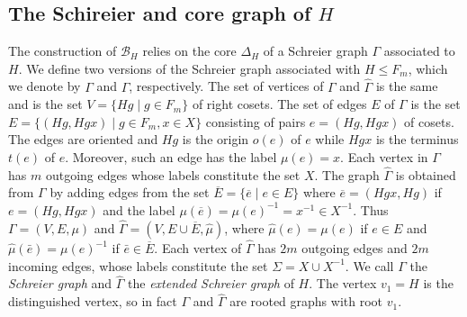 \documentclass{article}
\newcommand{\B}{\mathcal{B}}
\begin{document}
\subsection{The Schireier and core graph of $H$}\label{sec:Schreier_core}
The construction of $\B_H$ relies on the core $\Delta_H$ of a Schreier graph $\Gamma$ associated to $H$. We define two versions of the Schreier graph associated with $H \leq F_m$, which we denote by $\Gamma$ and $\widehat{\Gamma}$, respectively. The set of vertices of $\Gamma$ and $\widehat{\Gamma}$ is the same and is the set $V = \{ Hg \mid g \in F_m\}$ of right cosets. The set of edges $E$ of $\Gamma$ is the set $E = \{(Hg, Hgx)\mid  g \in F_m, x \in X\}$ consisting of pairs $e = (Hg, Hgx)$ of cosets. The edges are oriented and $Hg$ is the origin $o(e)$ of $e$ while $Hgx$ is the terminus $t(e)$ of $e$. Moreover, such an edge has the label $\mu(e) = x.$ Each vertex in $\Gamma$ has $m$ outgoing edges whose labels constitute the set $X$. The graph $\widehat{\Gamma}$ is obtained from $\Gamma$ by adding edges from the set $\overline{E} = \{\overline{e}\mid e \in E\}$ where $\overline{e} = (Hgx,Hg)$ if $e = (Hg, Hgx)$ and the label $\mu(\overline{e}) = \mu(e)^{-1} = x^{-1} \in X^{-1}.$ Thus $\Gamma = (V, E, \mu)$ and $\widehat{\Gamma} = (V,E\cup \overline{E},\widehat{\mu})$, where $\widehat{\mu}(e) = \mu(e)$ if $e \in E$ and $\widehat{\mu}(\bar e) = \mu(e)^{-1}$ if $\bar e \in \overline{E}$. Each vertex of $\widehat{\Gamma}$ has $2m$ outgoing edges and $2m$ incoming edges, whose labels constitute the set $\Sigma = X \cup X^{-1}$. We call $\Gamma$ the \emph{Schreier graph} and $\widehat{\Gamma}$ the \emph{extended Schreier graph} of $H$. The vertex $v_1 = H$ is the distinguished vertex, so in fact $\Gamma$ and $\widehat{\Gamma}$ are rooted graphs with root $v_1$. 
\end{document}
